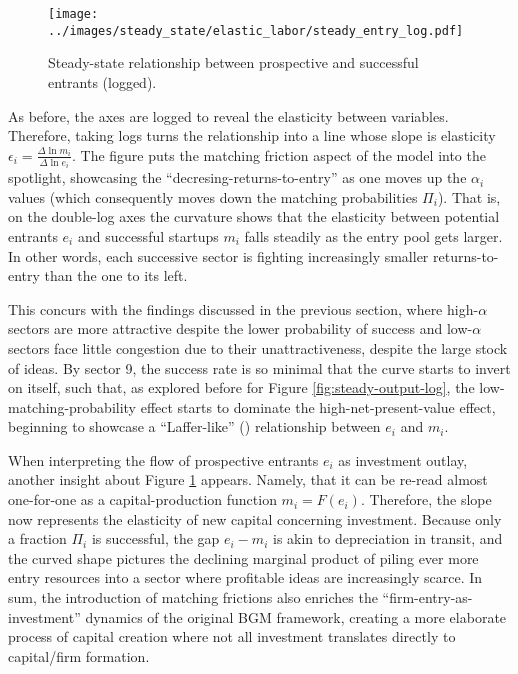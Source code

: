 \documentclass[a4paper,12pt]{article} %
\numberwithin{equation}{section} %
\numberwithin{figure}{section}
\numberwithin{table}{section}
\begin{document}
\begin{figure}[H]
  \centering
  \texttt{[image: ../images/steady\_state/elastic\_labor/steady\_entry\_log.pdf]}
  \caption{Steady-state relationship between prospective and successful entrants (logged).}
  \label{fig:steady-entry-log}
\end{figure}
As before, the axes are logged to reveal the elasticity between variables.
Therefore, taking logs turns the relationship into a line whose slope is elasticity $\epsilon_i = \frac{\Delta \ln m_i}{\Delta \ln e_i}$. 
The figure puts the matching friction aspect of the model into the spotlight, showcasing the ``decresing-returns-to-entry''
as one moves up the $\alpha_i$ values (which consequently moves down the matching probabilities $\Pi_i$). That is, on the double-log axes the 
curvature shows that the elasticity between potential entrants $e_i$ and successful startups $m_i$ falls steadily as the entry pool 
gets larger. In other words, each successive sector is fighting increasingly smaller returns-to-entry than the one to its left. 

This concurs with the findings discussed in the previous section, where high-$\alpha$ sectors are more attractive despite the lower probability
of success and low-$\alpha$ sectors face little congestion due to their unattractiveness, despite the large stock of ideas.
By sector 9, the success rate is so minimal that the curve starts to invert on itself, such that, as explored before for 
Figure \ref{fig:steady-output-log}, the low-matching-probability effect starts to dominate the high-net-present-value effect, beginning
to showcase a ``Laffer-like'' (\cite{laffer1974balance}) relationship between $e_i$ and $m_i$.

When interpreting the flow of prospective entrants $e_i$ as investment outlay, another insight about Figure \ref{fig:steady-entry-log} appears.
Namely, that it can be re-read almost one-for-one as a capital-production function $m_i = F(e_i)$.
Therefore, the slope now represents the elasticity of new capital concerning investment. Because only a fraction $\Pi_i$ is 
successful, the gap $e_i - m_i$ is akin to depreciation in transit, and the curved shape pictures the declining marginal 
product of piling ever more entry resources into a sector where profitable ideas are increasingly scarce. In sum, the introduction of
matching frictions also enriches the ``firm-entry-as-investment'' dynamics of the original BGM framework, creating a more elaborate
process of capital creation where not all investment translates directly to  capital/firm formation.
\end{document}
